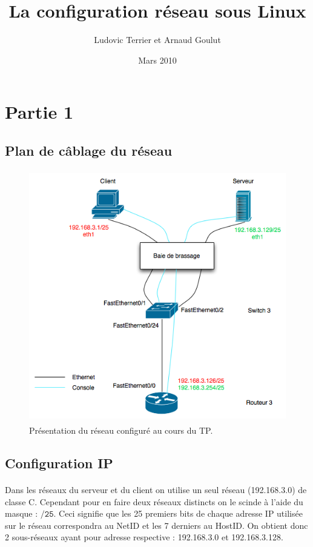 \documentclass[12pt,a4paper,notitlepage]{article}
\begin{document}
\title{La configuration réseau sous Linux}
\author{Ludovic Terrier et Arnaud Goulut}
\date{Mars 2010}
\maketitle



\thispagestyle{empty}
\newpage



\section{Partie 1}

\subsection{Plan de câblage du réseau}
\begin{figure}[!h]
\begin{center}
\includegraphics[height=11cm]{Diag.png}
\caption{Présentation du réseau configuré au cours du TP.}
\label{fig:do}
\end{center}
\end{figure}

\subsection{Configuration IP}
\paragraph{}Dans les réseaux du serveur et du client on utilise un seul réseau (192.168.3.0) de classe C. Cependant pour en faire deux réseaux distincts on le scinde à l'aide du masque : $\mathtt{/25}$. Ceci signifie que les 25 premiers bits de chaque adresse IP utilisée sur le réseau correspondra au NetID et les 7 derniers au HostID. On obtient donc 2 sous-réseaux ayant pour adresse respective : 192.168.3.0 et 192.168.3.128.
\end{document}
